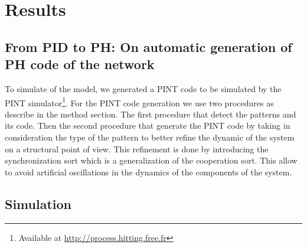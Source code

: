 
\section{Results}

\subsection{From PID to PH: On automatic generation of PH code of the network}

To simulate of the model, we generated a PINT code to be simulated by the PINT simulator\footnote{Available at \url{http://process.hitting.free.fr}}. 
For the PINT code generation we use two procedures as describe in the method section. The first procedure that detect the patterns and its code. Then the second 
procedure that generate the PINT code by taking in consideration the type of the pattern to better refine the dynamic of the system on a structural point of view.
This refinement is done by introducing the synchronization sort  which is a generalization of the cooperation sort. This allow  to avoid artificial oscillations
in the dynamics of the components of the system.




\subsection{Simulation}

